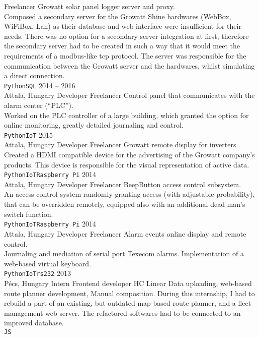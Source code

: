 \documentclass[9pt]{developercv} %
\begin{document}
\begin{entrylist}
		{Freelancer}
		{Growatt solar panel logger server and proxy. \\
			Composed a secondary server for the Growatt Shine hardwares (WebBox, WiFiBox, Lan) as their database and web
			interface were insufficient for their needs. There was no option for a secondary server integration at first, therefore the
			secondary server had to be created in such a way that it would meet the requirements of a modbus-like tcp protocol.
			The server was responsible for the communication between the Growatt server and the hardwares, whilst simulating a
			direct connection.
			\\ \texttt{Python}\slashsep\texttt{SQL}}
	\entry
		{2014 -- 2016 \\ Attala, Hungary}
		{Developer}
		{Freelancer}
		{Control panel that communicates with the alarm center (“PLC”). \\
			Worked on the PLC controller of a large building, which granted the option for online monitoring, greatly detailed
			journaling and control.
			\\ \texttt{Python}\slashsep\texttt{IoT}}
	\entry
		{2015 \\ Attala, Hungary}
		{Developer}
		{Freelancer}
		{Growatt remote display for inverters. \\
			Created a HDMI compatible device for the advertising of the Growatt company’s products. This device is responsible
			for the visual representation of active data.
			\\ \texttt{Python}\slashsep\texttt{IoT}\slashsep\texttt{Raspberry Pi}}
	\entry
		{2014 \\ Attala, Hungary}
		{Developer}
		{Freelancer}
		{BeepButton access control subsystem. \\
			An access control system randomly granting access (with adjustable probability), that can be overridden remotely,
			equipped also with an additional dead man’s switch function.
			\\ \texttt{Python}\slashsep\texttt{IoT}\slashsep\texttt{Raspberry Pi}}
	\entry
		{2014 \\ Attala, Hungary}
		{Developer}
		{Freelancer}
		{Alarm events online display and remote control.\\
			Journaling and mediation of serial port Texecom alarms. Implementation of a web-based virtual keyboard.
			\\ \texttt{Python}\slashsep\texttt{IoT}\slashsep\texttt{rs232}}
	\entry
		{2013 \\ Pécs, Hungary}
		{Intern \slashsep Frontend developer}
		{HC Linear}
		{Data uploading, web-based route planner development, Manual composition. During this internship, I had to rebuild a
			part of an existing, but outdated map-based route planner, and a fleet management web server. The refactored
			softwares had to be connected to an improved database.
			\\ \texttt{JS}}
\end{entrylist}
\end{document}
